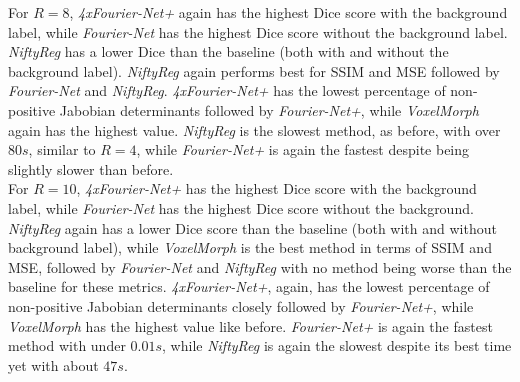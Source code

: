 For $R=8$, \emph{4xFourier-Net+} again has the highest Dice score with the background label, while \emph{Fourier-Net} has the highest Dice score without the background label. \emph{NiftyReg} has a lower Dice than the baseline (both with and without the background label). \emph{NiftyReg} again performs best for SSIM and MSE followed by \emph{Fourier-Net} and \emph{NiftyReg}. \emph{4xFourier-Net+} has the lowest percentage of non-positive Jabobian determinants followed by \emph{Fourier-Net+}, while \emph{VoxelMorph} again has the highest value. \emph{NiftyReg} is the slowest method, as before, with over $80s$, similar to $R=4$, while \emph{Fourier-Net+} is again the fastest despite being slightly slower than before.\\
For $R=10$, \emph{4xFourier-Net+} has the highest Dice score with the background label, while \emph{Fourier-Net} has the highest Dice score without the background. \emph{NiftyReg} again has a lower Dice score than the baseline (both with and without background label), while \emph{VoxelMorph} is the best method in terms of SSIM and MSE, followed by \emph{Fourier-Net} and \emph{NiftyReg} with no method being worse than the baseline for these metrics. \emph{4xFourier-Net+}, again, has the lowest percentage of non-positive Jabobian determinants closely followed by \emph{Fourier-Net+}, while \emph{VoxelMorph} has the highest value like before. \emph{Fourier-Net+} is again the fastest method with under $0.01s$, while \emph{NiftyReg} is again the slowest despite its best time yet with about $47s$.


